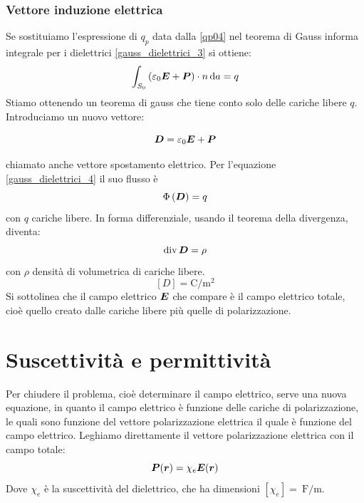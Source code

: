 \subsubsection{Vettore induzione elettrica}
Se sostituiamo l'espressione di $q_p$ data dalla \eqref{qp04} nel teorema di Gauss informa integrale per i dielettrici \eqref{gauss_dielettrici_3} si ottiene:
\begin{equation}
  \int_{S_0}\left(\varepsilon_0\boldsymbol{E}+\boldsymbol{P}\right)\cdot n\,\mathrm{d} a= q
  \label{gauss_dielettrici_4}
\end{equation}
Stiamo ottenendo un teorema di gauss che tiene conto solo delle cariche libere $q$. Introduciamo un nuovo vettore:
\begin{Def}
  \begin{equation}
    \boldsymbol{D}=\varepsilon_0\boldsymbol{E}+\boldsymbol{P}
    \label{vettore_induzione_elettrica01}
  \end{equation}
\end{Def}
chiamato anche vettore spostamento elettrico. Per l'equazione \eqref{gauss_dielettrici_4} il suo flusso è
\begin{equation}
  \Phi\left(\boldsymbol{D}\right)=q
\end{equation}
con $q$ cariche libere. In forma differenziale, usando il teorema della divergenza, diventa:
\begin{equation}
  \operatorname{div}\boldsymbol{D}=\rho
\end{equation}
con $\rho$ densità di volumetrica di cariche libere.
\[
  [D]=\si{\coulomb\per\meter^2}
\]
Si sottolinea che il campo elettrico $\boldsymbol{E}$ che compare è il campo elettrico totale, cioè quello creato dalle cariche libere più quelle di polarizzazione.
\section{Suscettività e permittività}
Per chiudere il problema, cioè determinare il campo elettrico, serve una nuova equazione, in quanto il campo elettrico è funzione delle cariche di polarizzazione, le quali sono funzione del vettore polarizzazione elettrica il quale è funzione del campo elettrico. Leghiamo direttamente il vettore polarizzazione elettrica con il campo totale:
\begin{equation}
  \boldsymbol{P}(\boldsymbol{r})=\chi_e\boldsymbol{E}(\boldsymbol{r})
\end{equation}
Dove $\chi_e$ è la suscettività del dielettrico, che ha dimensioni \(  [\chi_e] = \SI{}{\farad\per\meter} \).

